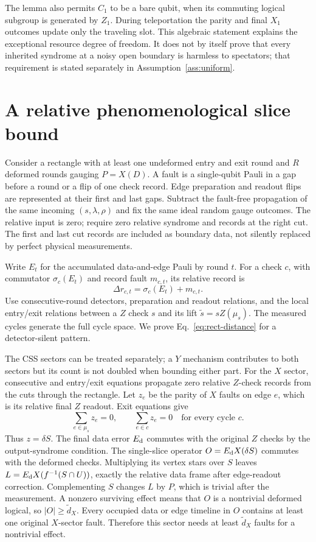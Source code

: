 The lemma also permits $C_1$ to be a bare qubit, when its commuting
logical subgroup is generated by $Z_1$. During teleportation the parity
and final $X_1$ outcomes update only the traveling slot. This algebraic
statement explains the exceptional resource degree of freedom. It does
not by itself prove that every inherited syndrome at a noisy open
boundary is harmless to spectators; that requirement is stated separately
in Assumption~\ref{ass:uniform}.

\section{A relative phenomenological slice bound}
\label{app:slice}

Consider a rectangle with at least one undeformed entry and exit round
and $R$ deformed rounds gauging $P=X(D)$. A fault is a single-qubit
Pauli in a gap before a round or a flip of one check record. Edge
preparation and readout flips are represented at their first and last
gaps. Subtract the fault-free propagation of the same incoming
$(s,\lambda,\rho)$ and fix the same ideal random gauge outcomes.
The relative input is zero; require zero relative syndrome and records
at the right cut. The first and last cut records are included as
boundary data, not silently replaced by perfect physical measurements.

Write $E_t$ for the accumulated data-and-edge Pauli by round $t$.
For a check $c$, with commutator $\sigma_c(E_t)$ and record fault
$m_{c,t}$, its relative record is
\begin{equation}
 \Delta r_{c,t}=\sigma_c(E_t)+m_{c,t}.
\end{equation}
Use consecutive-round detectors, preparation and readout relations, and
the local entry/exit relations between a $Z$ check $s$ and its lift
$\widetilde s=sZ(\mu_s)$. The measured cycles generate the full cycle
space. We prove Eq.~\eqref{eq:rect-distance} for a detector-silent pattern.

The CSS sectors can be treated separately; a $Y$ mechanism contributes
to both sectors but its count is not doubled when bounding either part.
For the $X$ sector, consecutive and entry/exit equations propagate zero
relative $Z$-check records from the cuts through the rectangle. Let $z_e$
be the parity of $X$ faults on edge $e$, which is its relative final
$Z$ readout. Exit equations give
\begin{equation}
 \sum_{e\in\mu_s}z_e=0,\qquad
 \sum_{e\in c}z_e=0\quad\text{for every cycle }c.
\end{equation}
Thus $z=\delta S$. The final data error $E_{\rm d}$ commutes with the
original $Z$ checks by the output-syndrome condition. The single-slice
operator $O=E_{\rm d}X(\delta S)$ commutes with the deformed checks.
Multiplying its vertex stars over $S$ leaves
$L=E_{\rm d}X(f^{-1}(S\cap U))$, exactly the relative data frame
after edge-readout correction. Complementing $S$ changes $L$ by $P$,
which is trivial after the measurement. A nonzero surviving effect means
that $O$ is a nontrivial deformed logical, so $|O|\ge\widetilde d_X$.
Every occupied data or edge timeline in $O$ contains at least one original
$X$-sector fault. Therefore this sector needs at least
$\widetilde d_X$ faults for a nontrivial effect.

